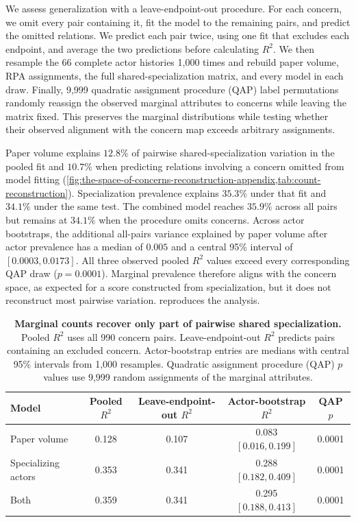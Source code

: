 \documentclass{fun_article}
\begin{document}
We assess generalization with a leave-endpoint-out procedure. For each concern, we omit every pair containing it, fit the model to the remaining pairs, and predict the omitted relations. We predict each pair twice, using one fit that excludes each endpoint, and average the two predictions before calculating $R^2$. We then resample the 66 complete actor histories 1,000 times and rebuild paper volume, RPA assignments, the full shared-specialization matrix, and every model in each draw. Finally, 9,999 quadratic assignment procedure (QAP) label permutations randomly reassign the observed marginal attributes to concerns while leaving the matrix fixed. This preserves the marginal distributions while testing whether their observed alignment with the concern map exceeds arbitrary assignments.

Paper volume explains $12.8\%$ of pairwise shared-specialization variation in the pooled fit and $10.7\%$ when predicting relations involving a concern omitted from model fitting (\cref{fig:the-space-of-concerns-reconstruction-appendix,tab:count-reconstruction}). Specialization prevalence explains $35.3\%$ under that fit and $34.1\%$ under the same test. The combined model reaches $35.9\%$ across all pairs but remains at $34.1\%$ when the procedure omits concerns. Across actor bootstraps, the additional all-pairs variance explained by paper volume after actor prevalence has a median of $0.005$ and a central 95\% interval of $[0.0003,0.0173]$. All three observed pooled $R^2$ values exceed every corresponding QAP draw ($p=0.0001$). Marginal prevalence therefore aligns with the concern space, as expected for a score constructed from specialization, but it does not reconstruct most pairwise variation. \texttt{} reproduces the analysis.

\begin{table}[!htbp]
\centering
\small
\caption{\textbf{Marginal counts recover only part of pairwise shared specialization.} Pooled $R^2$ uses all 990 concern pairs. Leave-endpoint-out $R^2$ predicts pairs containing an excluded concern. Actor-bootstrap entries are medians with central 95\% intervals from 1,000 resamples. Quadratic assignment procedure (QAP) $p$ values use 9,999 random assignments of the marginal attributes.}
\label{tab:count-reconstruction}
\begin{tabular}{@{}lcccc@{}}
\hline
Model & Pooled $R^2$ & Leave-endpoint-out $R^2$ & Actor-bootstrap $R^2$ & QAP $p$ \\
\hline
Paper volume & 0.128 & 0.107 & 0.083 $[0.016,0.199]$ & 0.0001 \\
Specializing actors & 0.353 & 0.341 & 0.288 $[0.182,0.409]$ & 0.0001 \\
Both & 0.359 & 0.341 & 0.295 $[0.188,0.413]$ & 0.0001 \\
\hline
\end{tabular}
\end{table}
\end{document}

